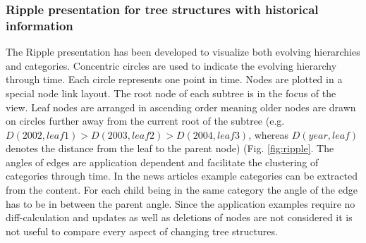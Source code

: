 \subsubsection{Ripple presentation for tree structures with historical information\cite{ishihara2006ripple}}
The Ripple presentation has been developed to visualize both evolving hierarchies and categories. Concentric circles are used to indicate the evolving hierarchy through time. Each circle represents one point in time. Nodes are plotted in a special node link layout. The root node of each subtree is in the focus of the view. Leaf nodes are arranged in ascending order meaning older nodes are drawn on circles further away from the current root of the subtree (e.g. $D(2002, leaf1) > D(2003, leaf2) > D(2004, leaf3)$, whereas $D(year, leaf)$ denotes the distance from the leaf to the parent node) (Fig. \ref{fig:ripple}. The angles of edges are application dependent and facilitate the clustering of categories through time. In the news articles example categories can be extracted from the content. For each child being in the same category the angle of the edge has to be in between the parent angle. Since the application examples require no diff-calculation and updates as well as deletions of nodes are not considered it is not useful to compare every aspect of changing tree structures.


